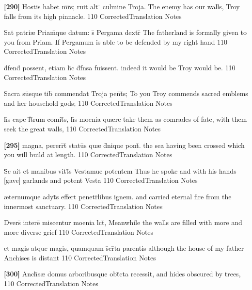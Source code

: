 \latline
  {\textbf{[290]} Hostis habet m\={}r\={}s; ruit alt\={} \={} culmine Troja.}
  { The enemy has our walls, Troy falls from its high pinnacle. }
  {110}
  { CorrectedTranslation }
  { Notes }


\latline
  {Sat patri{\ae} Priam\={}que datum: s\={\macron {\i}} Pergama dextr\={}}
  { The fatherland is formally given to you from Priam.  If Pergamum is able to be defended by my right hand }
  {110}
  { CorrectedTranslation }
  { Notes }


\latline
  {d\={}fend\={\macron {\i}} possent, etiam h\={}c d\={}f\={}nsa fuissent.}
  { indeed it would be Troy would be. }
  {110}
  { CorrectedTranslation }
  { Notes }


\latline
  {Sacra su\={}sque tib\={\macron {\i}} commendat Troja pen\={}t\={\macron {\i}}s;}
  { To you Troy commends sacred emblems and her household gods; }
  {110}
  { CorrectedTranslation }
  { Notes }


\latline
  {h\={}s cape f\={}t\={}rum comit\={}s, h\={\macron {\i}}s moenia qu{\ae}re }
  { take them as comrades of fate, with them seek the great walls, }
  {110}
  { CorrectedTranslation }
  { Notes }


\latline
  {\textbf{[295]} magna, pererr\={}t\={} statu\={}s qu{\ae} d\={}nique pont\={}.}
  { the sea having been crossed which you will build at length. }
  {110}
  { CorrectedTranslation }
  { Notes }


\latline
  {S\={\macron {\i}}c ait et manibus vitt\={}s Vestamue potentem}
  { Thus he spoke and with his hands [gave] garlands and potent Vesta }
  {110}
  { CorrectedTranslation }
  { Notes }


\latline
  {{\ae}ternumque adyt\={\macron {\i}}s effert penetr\={}libus ignem.}
  { and carried eternal fire from the innermost sanctuary. }
  {110}
  { CorrectedTranslation }
  { Notes }


\latline
  {D\={\macron {\i}}vers\={} intere\={} miscentur moenia l\={}ct\={},}
  { Meanwhile the walls are filled with more and more diverse grief }
  {110}
  { CorrectedTranslation }
  { Notes }


\latline
  {et magis atque magis, quamquam s\={}cr\={}ta parentis}
  { although the house of my father Anchises is distant }
  {110}
  { CorrectedTranslation }
  { Notes }


\latline
  {\textbf{[300]} Anch\={\macron {\i}}s{\ae} domus arboribusque obt\={}cta recessit,}
  { and hides obscured by trees, }
  {110}
  { CorrectedTranslation }
  { Notes }


